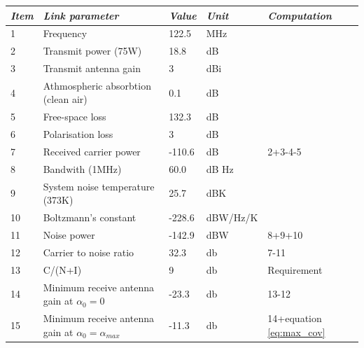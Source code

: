 \begin{center}
 \label{tab:122.5}
  \begin{tabular}{ l  l  l  l  l}
    \hline
   \textit{Item} & \textit{Link parameter} & \textit{Value} & \textit{Unit} & \textit{Computation} \\ \hline
    1 & Frequency	& 122.5 & MHz & \\ \hline
    2 & Transmit power (75W) & 18.8 & dB & \\ \hline
    3 & Transmit antenna gain & 3 & dBi & \\ \hline
    4 & Athmospheric absorbtion (clean air) & 0.1 & dB & \\ \hline
    5 & Free-space loss & 132.3 & dB & \\ \hline
    6 & Polarisation loss & 3 & dB & \\ \hline
    7 & Received carrier power & -110.6 & dB & 2+3-4-5\\ \hline
    8 & Bandwith (1MHz) & 60.0 & dB Hz & \\ \hline 
    9 & System noise temperature (373K) & 25.7 & dBK& \\ \hline 
    10 & Boltzmann's constant & -228.6 & dBW/Hz/K& \\ \hline 
    11 & Noise power & -142.9 & dBW& 8+9+10\\ \hline 
    12 & Carrier to noise ratio & 32.3 & db & 7-11\\ \hline 
    13 & C/(N+I) & 9 & db & Requirement\\ \hline
    14 & Minimum receive antenna gain at $\alpha_0 = 0 $ & -23.3 & db & 13-12\\ \hline
    15 & Minimum receive antenna gain at $\alpha_0 = \alpha_{max} $ & -11.3 & db & 14+equation \ref{eq:max_cov} \\ \hline
  \end{tabular}
\end{center}
